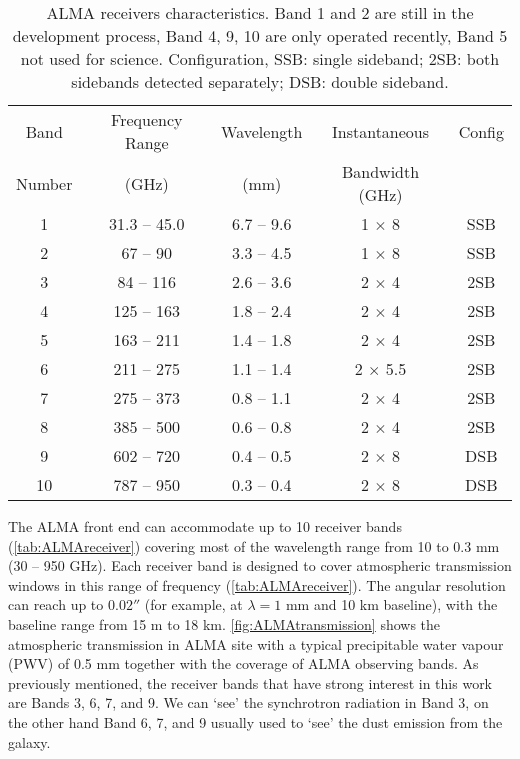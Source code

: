 \begin{table}[!ht]
\centering
\caption[ALMA receivers characteristics.]{ALMA receivers characteristics. Band 1 and 2 are still in the development process, Band 4, 9, 10 are only operated recently, Band 5 not used for science. Configuration, SSB: single sideband; 2SB: both sidebands detected separately; DSB: double sideband.}
\label{tab:ALMAreceiver}
\begin{tabular}{ccccc}
\hline
Band   & Frequency Range & Wavelength & Instantaneous   & Config \\
Number & (GHz)           & (mm)       & Bandwidth (GHz) &               \\
\hline
1      & 31.3 -- 45.0     & 6.7 -- 9.6  & 1 $\times$ 8           & SSB           \\
2      & 67 -- 90         & 3.3 -- 4.5  & 1 $\times$ 8           & SSB           \\
3      & 84 -- 116        & 2.6 -- 3.6  & 2 $\times$ 4           & 2SB           \\
4      & 125 -- 163       & 1.8 -- 2.4  & 2 $\times$ 4           & 2SB           \\
5      & 163 -- 211       & 1.4 -- 1.8  & 2 $\times$ 4           & 2SB           \\
6      & 211 -- 275       & 1.1 -- 1.4  & 2 $\times$ 5.5         & 2SB           \\
7      & 275 -- 373       & 0.8 -- 1.1  & 2 $\times$ 4           & 2SB           \\
8      & 385 -- 500       & 0.6 -- 0.8  & 2 $\times$ 4           & 2SB           \\
9      & 602 -- 720       & 0.4 -- 0.5  & 2 $\times$ 8           & DSB           \\
10     & 787 -- 950       & 0.3 -- 0.4  & 2 $\times$ 8           & DSB   \\
\hline
\end{tabular}
\end{table}

The ALMA front end can accommodate up to 10 receiver bands (\autoref{tab:ALMAreceiver}) covering most of the 
wavelength range from 10 to 0.3 mm (30 \--- 950 GHz). Each receiver band is designed to cover atmospheric transmission 
windows in this range of frequency (\autoref{tab:ALMAreceiver}). The angular resolution can reach up to $0.02''$ 
(for example, at $\lambda = 1$  mm and 10 km baseline), with the baseline range from 15 m to 18 km. \autoref{fig:ALMAtransmission} shows 
the atmospheric transmission in ALMA site with a typical precipitable water vapour (PWV) of 0.5 mm 
together with the coverage of ALMA observing bands. As previously mentioned, 
the receiver bands that have strong interest in this work are Bands 3, 6, 7, and 9. We can `see' the synchrotron radiation in Band 3, on the other hand Band 6, 7, and 9 usually used to `see' the dust emission from the galaxy. 



\cleardoublepage

